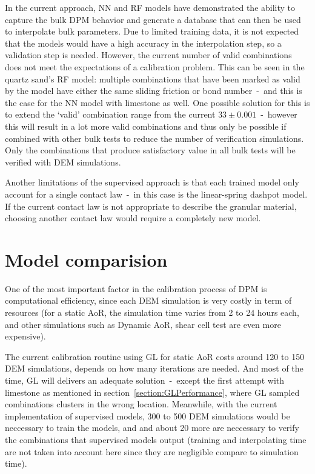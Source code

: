 In the current approach, NN and RF models have demonstrated the ability to capture the bulk DPM behavior and generate a database that can then be used to interpolate bulk parameters. Due to limited training data, it is not expected that the models would have a high accuracy in the interpolation step, so a validation step is needed. However, the current number of valid combinations does not meet the expectations of a calibration problem. This can be seen in the quartz sand's RF model: multiple combinations that have been marked as valid by the model have either the same sliding friction or bond number~-~and this is the case for the NN model with limestone as well. One possible solution for this is to extend the `valid' combination range from the current $33\pm0.001$~-~however this will result in a lot more valid combinations and thus only be possible if combined with other bulk tests to reduce the number of verification simulations. Only the combinations that produce satisfactory value in all bulk tests will be verified with DEM simulations. 

Another limitations of the supervised approach is that each trained model only account for a single contact law~-~in this case is the linear-spring dashpot model. If the current contact law is not appropriate to describe the granular material, choosing another contact law would require a completely new model. 



\section{Model comparision}\label{section:discussion}

One of the most important factor in the calibration process of DPM is computational efficiency, since each DEM simulation is very costly in term of resources (for a static AoR, the simulation time varies from 2 to 24 hours each, and other simulations such as Dynamic AoR, shear cell test are even more expensive). 

The current calibration routine using GL for static AoR costs around 120 to 150 DEM simulations, depends on how many iterations are needed. And most of the time, GL will delivers an adequate solution~-~except the first attempt with limestone as mentioned in section~\ref{section:GLPerformance}, where GL sampled combinations clusters in the wrong location. Meanwhile, with the current implementation of supervised models, 300 to 500 DEM simulations would be neccessary to train the models, and and about 20 more are neccessary to verify the combinations that supervised models output (training and interpolating time are not taken into account here since they are negligible compare to simulation time). 

